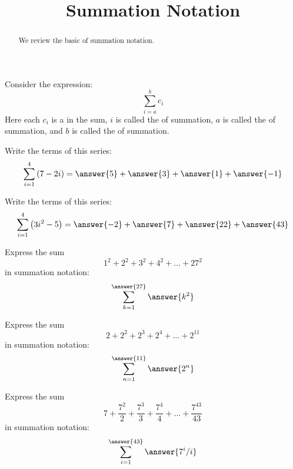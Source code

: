 \documentclass{ximera}
\title[Refresh:]{Summation Notation}
\begin{document}
\begin{abstract}
  We review the basic of summation notation.
\end{abstract}
\maketitle

\begin{problem}
  Consider the expression:
  \[
  \sum_{i=a}^b c_i
  \]
  Here each $c_i$ is a
 in the sum, 
  $i$ is called the  of summation, $a$ is called the
   of summation,
  and $b$ is called the
  of summation.
\end{problem}

\begin{problem}
  Write the terms of this series:
  \[
  \sum_{i=1}^4 \left(7-2i\right)=\answer{5}+\answer{3}+\answer{1}+\answer{-1}
  \]
\end{problem}

\begin{problem}
  Write the terms of this series:
  \[
  \sum_{i=1}^4 \left(3i^2-5\right)=\answer{-2}+\answer{7}+\answer{22}+\answer{43}
  \]
\end{problem}

\begin{problem}
  Express the sum
  \[
  1^2 + 2^2 + 3^2 + 4^2+\dots+27^2
  \]
  in summation notation:
  \[
  \sum_{k=1}^{\answer{27}} \answer{k^2}
  \]
\end{problem}

\begin{problem}
  Express the sum
  \[
  2 + 2^2 + 2^3 + 2^4+\dots+2^{11}
  \]
  in summation notation:
  \[
  \sum_{n=1}^{\answer{11}} \answer{2^n}
  \]
\end{problem}


\begin{problem}
  Express the sum
  \[
  7 + \frac{7^2}{2} + \frac{7^3}3 + \frac{7^4}{4}+\dots+\frac{7^{43}}{43}
  \]
  in summation notation:
  \[
  \sum_{i=1}^{\answer{43}} \answer{7^i/i}
  \]
\end{problem}
\end{document}
